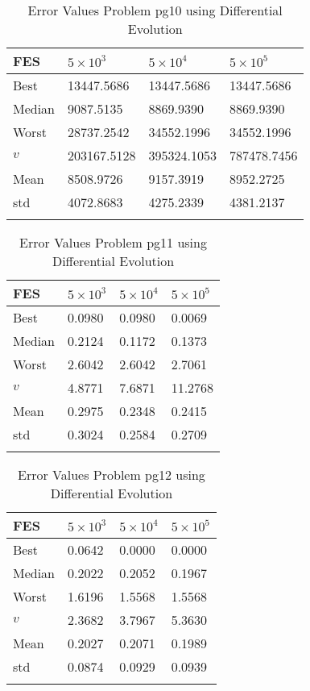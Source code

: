 \documentclass[10pt, a4paper]{book}
\begin{document}
\begin{center}
\begin{longtable}{l l l l}
FES & $5 \times 10^{3}$ & $5 \times 10^{4}$ & $5 \times 10^{5}$ \\
\hline
Best & 13447.5686 & 13447.5686 & 13447.5686 \\
Median & 9087.5135 & 8869.9390 & 8869.9390 \\
Worst & 28737.2542 & 34552.1996 & 34552.1996 \\
$v$ & 203167.5128 & 395324.1053 & 787478.7456 \\
Mean & 8508.9726 & 9157.3919 & 8952.2725 \\
std & 4072.8683 & 4275.2339 & 4381.2137 \\
\caption{ Error Values Problem pg10 using Differential Evolution }
\end{longtable}
\end{center}

\begin{center}
\begin{longtable}{l l l l}
FES & $5 \times 10^{3}$ & $5 \times 10^{4}$ & $5 \times 10^{5}$ \\
\hline
Best & 0.0980 & 0.0980 & 0.0069 \\
Median & 0.2124 & 0.1172 & 0.1373 \\
Worst & 2.6042 & 2.6042 & 2.7061 \\
$v$ & 4.8771 & 7.6871 & 11.2768 \\
Mean & 0.2975 & 0.2348 & 0.2415 \\
std & 0.3024 & 0.2584 & 0.2709 \\
\caption{ Error Values Problem pg11 using Differential Evolution }
\end{longtable}
\end{center}

\begin{center}
\begin{longtable}{l l l l}
FES & $5 \times 10^{3}$ & $5 \times 10^{4}$ & $5 \times 10^{5}$ \\
\hline
Best & 0.0642 & 0.0000 & 0.0000 \\
Median & 0.2022 & 0.2052 & 0.1967 \\
Worst & 1.6196 & 1.5568 & 1.5568 \\
$v$ & 2.3682 & 3.7967 & 5.3630 \\
Mean & 0.2027 & 0.2071 & 0.1989 \\
std & 0.0874 & 0.0929 & 0.0939 \\
\caption{ Error Values Problem pg12 using Differential Evolution }
\end{longtable}
\end{center}
\end{document}
